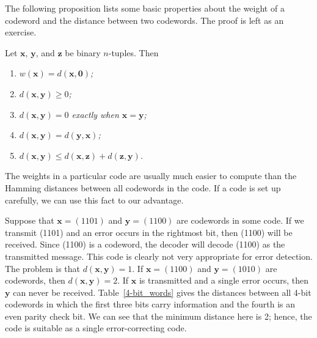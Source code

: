  
The following proposition lists some basic properties about the weight
of a codeword and the distance between two codewords. The proof is
left as an exercise.
 
 
\begin{proposition}
Let ${\mathbf x}$, ${\mathbf y}$, and ${\mathbf z}$ be binary $n$-tuples.
Then 
\begin{enumerate}
 
\rm \item \it
$w({\mathbf x}) = d( {\mathbf x}, {\mathbf 0})$; 
 
\rm \item \it
$d( {\mathbf x}, {\mathbf y}) \geq 0$; 
 
\rm \item \it
$d( {\mathbf x}, {\mathbf y}) = 0$ exactly when ${\mathbf x} = {\mathbf y}$; 
 
\rm \item \it
$d( {\mathbf x}, {\mathbf y})= d( {\mathbf y}, {\mathbf x})$; 
 
\rm \item \it
$d( {\mathbf x}, {\mathbf y}) \leq d( {\mathbf x}, {\mathbf z}) + d( {\mathbf
z}, {\mathbf y})$. 
 
\end{enumerate}
\end{proposition}
 
 
The weights in a particular code are usually much easier to compute
than the Hamming distances between all codewords in the code. If a
code is set up carefully, we can use this fact to our advantage.
 
 
Suppose that ${\mathbf x} = (1101)$ and ${\mathbf y} = (1100)$ are
codewords in some code. If we transmit (1101) and an error occurs in
the rightmost bit, then (1100) will be received. Since (1100) is a
codeword, the decoder will decode (1100) as the transmitted message.
This code is clearly not very appropriate for error detection. The
problem is that $d({\mathbf x}, {\mathbf y}) = 1$. If ${\mathbf x} = (1100)$
and ${\mathbf y} = (1010)$ are codewords, then $d({\mathbf x}, {\mathbf y})
= 2$. If ${\mathbf x}$ is transmitted and a single error occurs, then
${\mathbf y}$ can never be received. Table~\ref{4-bit_words} gives the distances
between all 4-bit codewords in which the first three bits carry
information and the fourth is an even parity check bit. We can see
that the minimum distance here is 2; hence, the code is suitable as
a single error-correcting code. 
 
